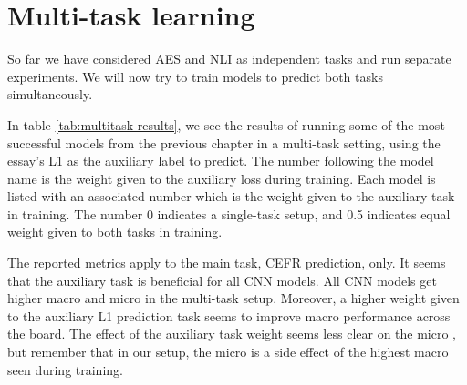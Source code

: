 \chapter{Multi-task learning}

So far we have considered \ac{AES} and \ac{NLI} as independent tasks and run
separate experiments. We will now try to train models to predict both tasks
simultaneously.

In table \ref{tab:multitask-results}, we see the results of running some of
the most successful models from the previous chapter in a multi-task setting,
using the essay's L1 as the auxiliary label to predict. The number following
the model name is the weight given to the auxiliary loss during training.
Each model is listed with an associated number which is the weight given to
the auxiliary task in training. The number 0 indicates a single-task setup,
and 0.5 indicates equal weight given to both tasks in training.

The reported metrics apply to the main task, CEFR prediction, only. It seems
that the auxiliary task is beneficial for all CNN models. All CNN models get
higher macro and micro \FI in the multi-task setup. Moreover, a higher weight
given to the auxiliary L1 prediction task seems to improve macro \FI
performance across the board. The effect of the auxiliary task weight seems
less clear on the micro \FI, but remember that in our setup, the micro \FI is
a side effect of the highest macro \FI seen during training.

